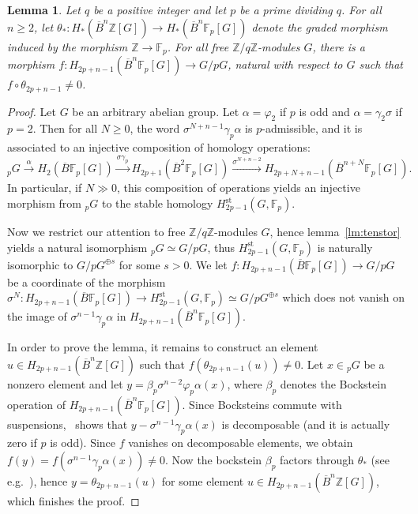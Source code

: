 \documentclass{amsart}
\newtheorem{lemma}[formula]{Lemma}
\theoremstyle{definition}
\theoremstyle{remark}
\newcommand{\Z}{\mathbb Z}
\newcommand{\F}{\mathbb F}
\renewcommand{\ge}{\geqslant}
\renewcommand{\phi}{\varphi}
\begin{document}
\begin{lemma}\label{lm:stablemap}
	Let $q$ be a positive integer and let $p$ be a prime dividing $q$. For all $n\ge 2$, let $\theta_*\colon H_{*}(\overline{B}^n\Z[G])\to H_{*}(\overline{B}^n\F_p[G])$ denote the graded morphism induced by the morphism $\Z\to \F_p$. For all free $\Z/q\Z$-modules $G$, there is a morphism $f\colon H_{2p+n-1}(\overline{B}^n\F_p[G])\to G/pG$, natural with respect to $G$ such that $f\circ \theta_{2p+n-1}\ne 0$.
\end{lemma}
\begin{proof}
	Let $G$ be an arbitrary abelian group.
	Let $\alpha=\phi_2$ if $p$ is odd and $\alpha=\gamma_2\sigma$ if $p=2$. Then for all $N\ge 0$, the word $\sigma^{N+n-1}\gamma_p\alpha$ is $p$-admissible, and it is associated to an injective composition of homology operations:
	\[
		_pG\xrightarrow[]{\alpha}H_2(\overline{B}\F_p[G])\xrightarrow[]{\sigma\gamma_p} H_{2p+1}(\overline{B}^2\F_p[G])\xrightarrow[]{\sigma^{N+n-2}}H_{2p+N+n-1}(\overline{B}^{n+N}\F_p[G]).
	\]
	In particular, if $N\gg 0$, this composition of operations yields an injective morphism from $_pG$ to the stable homology $H^{\mathrm{st}}_{2p-1}(G,\F_p)$.
	
	Now we restrict our attention to free $\Z/q\Z$-modules $G$, hence lemma~\ref{lm:tenstor} yields a natural isomorphism $_pG\simeq G/pG$, thus $H_{2p-1}^{\mathrm{st}}(G,\F_p)$ is naturally isomorphic to $G/pG^{\oplus s}$ for some $s>0$. We let $f\colon H_{2p+n-1}(\overline{B}\F_p[G])\to G/pG$ be a coordinate of the morphism $\sigma^N\colon H_{2p+n-1}(\overline{B}\F_p[G])\to H_{2p-1}^{\mathrm{st}}(G,\F_p)\simeq G/pG^{\oplus s}$ which does not vanish on the image of $\sigma^{n-1}\gamma_p\alpha$ in $H_{2p+n-1}(\overline{B}^{n}\F_p[G])$. 
	
	In order to prove the lemma, it remains to construct an element $u\in H_{2p+n-1}(\overline{B}^n\Z[G])$ such that $f(\theta_{2p+n-1}(u))\ne 0$. Let $x\in {}_pG$ be a nonzero element and let $y=\beta_p\sigma^{n-2}\phi_p\alpha(x)$, where $\beta_p$ denotes the Bockstein operation of $H_{2p+n-1}(\overline{B}^n\F_p[G])$. Since Bocksteins commute with suspensions,~\cite[Exp.~8, Thm.~1]{ca-54} shows that $y-\sigma^{n-1}\gamma_p\alpha(x)$ is decomposable (and it is actually zero if $p$ is odd). Since $f$ vanishes on decomposable elements, we obtain $f(y)=f(\sigma^{n-1}\gamma_p\alpha(x))\ne 0$. 
	Now the bockstein $\beta_p$ factors through $\theta_*$ (see e.g.~\cite[Exp.~8,~p.8-03]{ca-54}), hence $y=\theta_{2p+n-1}(u)$ for some element $u\in H_{2p+n-1}(\overline{B}^n\Z[G])$, which finishes the proof. 
\end{proof}
\end{document}
